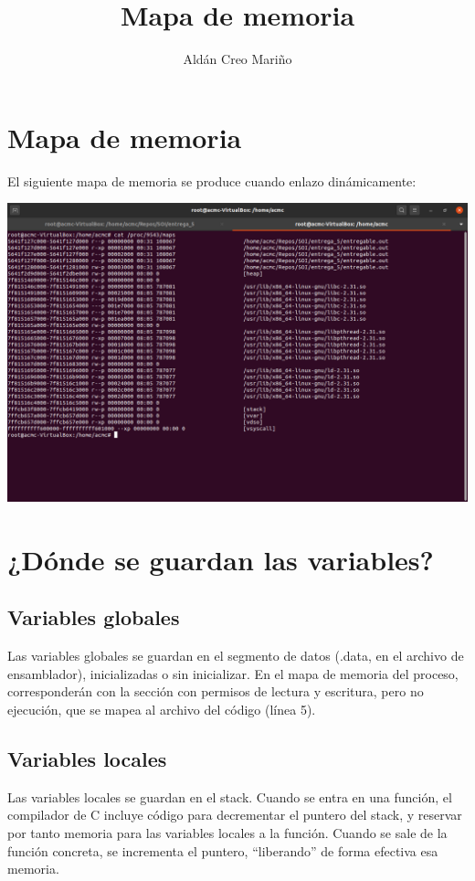 \documentclass[a4paper]{article}
\title{Mapa de memoria}
\author{Aldán Creo Mariño}
\begin{document}
\maketitle

\section{Mapa de memoria}

El siguiente mapa de memoria se produce cuando enlazo dinámicamente:

\includegraphics[scale=0.423]{6_padre.png}

\section{¿Dónde se guardan las variables?}

\subsection{Variables globales}

Las variables globales se guardan en el segmento de datos ({\ttfamily.data}, en el archivo de ensamblador), inicializadas o sin inicializar. En el mapa de memoria del proceso, corresponderán con la sección con permisos de lectura y escritura, pero no ejecución, que se mapea al archivo del código (línea 5).

\subsection{Variables locales}

Las variables locales se guardan en el stack. Cuando se entra en una función, el compilador de C incluye código para decrementar el puntero del stack, y reservar por tanto memoria para las variables locales a la función. Cuando se sale de la función concreta, se incrementa el puntero, ``liberando'' de forma efectiva esa memoria.
\end{document}
